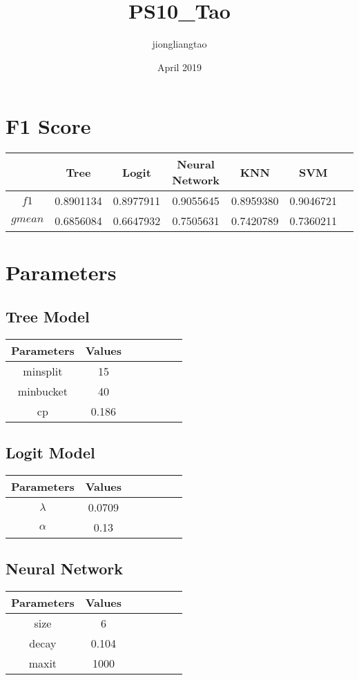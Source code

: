 \documentclass{article}
\title{PS10_Tao}
\author{jiongliangtao }
\date{April 2019}
\begin{document}
\maketitle

\section{F1 Score}

\begin{tabular}{c|cccccc}
\hline\hline
 & Tree & Logit & Neural Network & KNN & SVM \\ \hline
$f1$ & 0.8901134 & 0.8977911 & 0.9055645 & 0.8959380 & 0.9046721 \\ \hline 
$gmean$ & 0.6856084 & 0.6647932 & 0.7505631 & 0.7420789 & 0.7360211 \\ \hline 
\end{tabular}

\section{Parameters}
\subsection{Tree Model}
\begin{tabular}{c|cccccc}
\hline\hline
 Parameters & Values\\\hline
 minsplit & 15\\\hline
 minbucket & 40\\\hline
 cp & 0.186
\end{tabular}


\subsection{Logit Model}
\begin{tabular}{c|cccccc}
\hline\hline
 Parameters & Values\\\hline
$\lambda$ & 0.0709\\\hline
$\alpha$ & 0.13\\\hline
\end{tabular}

\subsection{Neural Network}
\begin{tabular}{c|cccccc}
\hline\hline
 Parameters & Values\\\hline
 size & 6\\\hline
decay & 0.104\\\hline
maxit & 1000\\\hline
\end{tabular}
\end{document}
